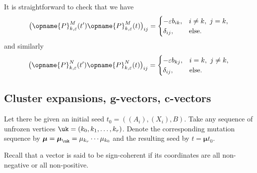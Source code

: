 \documentclass[pdftex]{sigma}
\newcommand{\seq}{\boldsymbol{\mu}}%
\newcommand{\trans}{\opname{P}}
\numberwithin{equation}{section}
\begin{document}
\begin{Remark}\label{rem:signed_mutation_non_identity}
 It is straightforward to check that we have
 \[\bigl(\trans^M_{k,\varepsilon}(t')\trans^M_{k,\varepsilon}(t)\bigr)_{ij}=\begin{cases}
 -\varepsilon b_{ik}, & i\neq k,\ j=k,\\
 \delta_{ij}, & \mathrm{else}.
 \end{cases}\]
 and similarly
 \[
 \bigl(\trans^N_{k,\varepsilon}(t')\trans^N_{k,\varepsilon}(t)\bigr)_{ij} = \begin{cases}
 -\varepsilon b_{kj}, & i=k,\ j\neq k,\\
 \delta_{ij}, & \mathrm{else}.
 \end{cases}
 \]
\end{Remark}

\subsection[Cluster expansions, g-vectors, c-vectors]{Cluster expansions, $\boldsymbol{g}$-vectors, $\boldsymbol{c}$-vectors}

Let there be given an initial seed $t_{0}=((A_{i}),(X_{i}),B)$. Take
any sequence of unfrozen vertices $\uk=(k_{0},k_{1},\ldots,k_{r})$.
Denote the corresponding mutation sequence by $\seq=\seq_{\uk}=\mu_{k_{r}}\cdots\mu_{k_{0}}$
and the resulting seed by $t=\seq t_{0}$.

Recall that a vector is said to be sign-coherent if its coordinates
are all non-negative or all non-positive.
\end{document}
